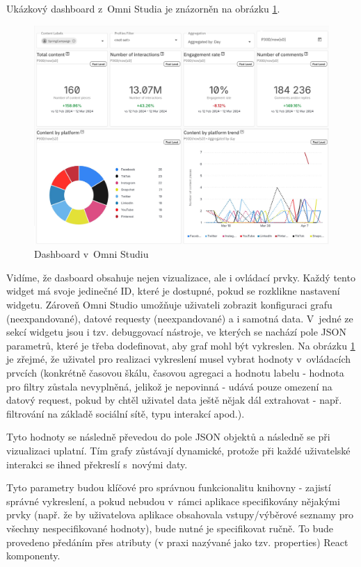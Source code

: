 \documentclass[czech, bc, kiv, he, iso690numb, viewonly]{fasthesis} %
\begin{document}
Ukázkový dashboard z~Omni Studia je znázorněn na obrázku \ref{fig:omniStudioDashboard}.
\begin{figure}
	\centering
	\includegraphics[width=1\textwidth]{pictures/omni-studio.png}
	\caption{Dashboard v~Omni Studiu}
	\label{fig:omniStudioDashboard}
\end{figure}
Vidíme, že dasboard obsahuje nejen vizualizace, ale i ovládací prvky. Každý tento widget má svoje jedinečné ID, které je dostupné, pokud se rozklikne nastavení widgetu. Zároveň Omni Studio 
umožňuje uživateli zobrazit konfiguraci grafu (neexpandované), datové requesty (neexpandované) a i samotná data. V~jedné ze sekcí widgetu jsou i tzv. debuggovací nástroje, ve kterých se nachází pole JSON parametrů,
které je třeba dodefinovat, aby graf mohl být vykreslen. Na obrázku \ref{fig:omniStudioDashboard} je zřejmé, že uživatel pro realizaci vykreslení musel vybrat hodnoty v~ovládacích prvcích (konkrétně 
časovou škálu, časovou agregaci a hodnotu labelu - hodnota pro filtry zůstala nevyplněná, jelikož je nepovinná - udává pouze omezení na datový request, pokud by chtěl uživatel data ještě nějak
dál extrahovat - např. filtrování na základě sociální sítě, typu interakcí apod.). 

Tyto hodnoty se následně převedou do pole JSON objektů a následně se při vizualizaci uplatní. Tím grafy zůstávají dynamické, protože při každé uživatelské interakci se ihned překreslí s~novými
daty.

Tyto parametry budou klíčové pro správnou funkcionalitu knihovny - zajistí správné vykreslení, a pokud nebudou v~rámci aplikace specifikovány nějakými prvky (např. že by uživatelova aplikace obsahovala
vstupy/výběrové seznamy pro všechny nespecifikované hodnoty), bude nutné je specifikovat ručně. To bude provedeno předáním přes atributy (v praxi nazývané jako tzv. properties) React komponenty.
\end{document}
